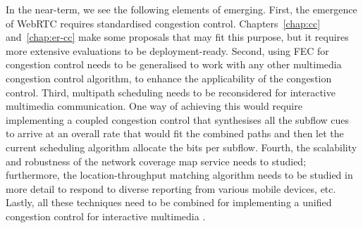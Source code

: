 
In the near-term, we see the following elements of emerging. First,
the emergence of WebRTC requires standardised congestion control.
Chapters~\ref{chap:cc} and~\ref{chap:er-cc} make some proposals that may fit
this purpose, but it requires more extensive evaluations to be deployment-ready.
Second, using FEC for congestion control needs to be generalised to work with
any other multimedia congestion control algorithm, to enhance the
applicability of the congestion control. Third, multipath scheduling needs to be reconsidered for
interactive multimedia communication. One way of achieving this would require
implementing a coupled congestion control that synthesises all the subflow
cues to arrive at an overall rate that would fit the combined paths and then
let the current scheduling algorithm allocate the bits per subflow. Fourth,
the scalability and robustness of the network coverage map service needs to
studied; furthermore, the location-throughput matching algorithm needs to be
studied in more detail to respond to diverse reporting from
various mobile devices, etc. Lastly, all these techniques need to be combined for
implementing a unified congestion control for interactive multimedia .




